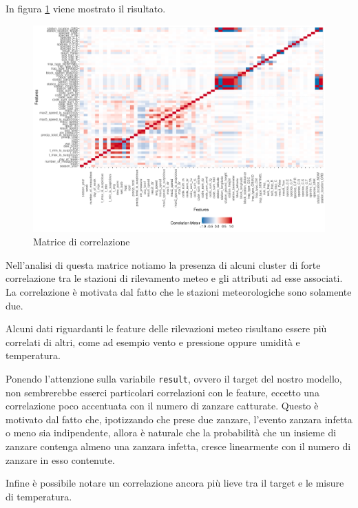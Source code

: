 In figura \ref{fig:plot_correlation} viene mostrato il risultato.

\begin{figure}[htb]
	\centering
	\includegraphics[width=1\columnwidth]{images/ml/plot_correlation}
	\caption{Matrice di correlazione}
	\label{fig:plot_correlation}
\end{figure}

Nell'analisi di questa matrice notiamo la presenza di alcuni cluster di forte 
correlazione tra le stazioni di rilevamento meteo e gli attributi ad esse 
associati. La correlazione è motivata dal fatto che le stazioni meteorologiche 
sono solamente due.

Alcuni dati riguardanti le feature delle rilevazioni meteo risultano essere più 
correlati di altri, come ad esempio vento e pressione oppure umidità e 
temperatura.

Ponendo l'attenzione sulla variabile \texttt{result}, ovvero il target del 
nostro modello, non sembrerebbe esserci particolari correlazioni con le 
feature, eccetto una correlazione poco accentuata con il numero di 
zanzare catturate. Questo è motivato dal fatto che, ipotizzando che prese due 
zanzare, l'evento zanzara infetta o meno sia indipendente, allora è naturale 
che la probabilità che un insieme di zanzare contenga almeno una zanzara 
infetta, cresce linearmente con il numero di zanzare in esso contenute.

Infine è possibile notare un correlazione ancora più lieve tra il target e le 
misure di temperatura. 
